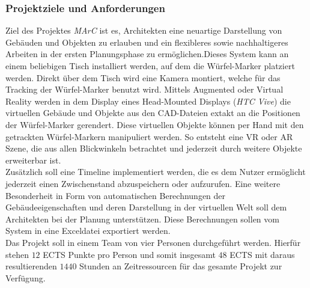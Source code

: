 \subsubsection{Projektziele und Anforderungen}
Ziel des Projektes \textit{MArC} ist es, Architekten eine neuartige Darstellung von Gebäuden und Objekten zu erlauben und ein flexibleres sowie nachhaltigeres Arbeiten in der ersten Planungsphase zu ermöglichen.Dieses System kann an einem beliebigen Tisch installiert werden, auf dem die Würfel-Marker platziert werden. Direkt über dem Tisch wird eine Kamera montiert, welche für das Tracking der Würfel-Marker benutzt wird.  Mittels Augmented oder Virtual Reality werden in dem Display eines Head-Mounted Displays (\textit{HTC Vive}) die virtuellen Gebäude und Objekte aus den CAD-Dateien extakt an die Positionen der Würfel-Marker gerendert. Diese virtuellen Objekte können per Hand mit den getrackten Würfel-Markern manipuliert werden. So entsteht eine VR oder AR Szene, die aus allen Blickwinkeln betrachtet und jederzeit durch weitere Objekte erweiterbar ist. \\
Zusätzlich soll eine Timeline implementiert werden, die es dem Nutzer ermöglicht jederzeit einen Zwischenstand abzuspeichern oder aufzurufen. Eine weitere Besonderheit in Form von automatischen Berechnungen der Gebäudeeigenschaften und deren Darstellung in der virtuellen Welt soll dem Architekten bei der Planung unterstützen. Diese Berechnungen sollen vom System in eine Exceldatei exportiert werden.\\
Das Projekt soll in einem Team von vier Personen durchgeführt werden. Hierfür stehen $12$ ECTS Punkte pro Person und somit insgesamt $48$ ECTS mit daraus resultierenden $1440$ Stunden an Zeitressourcen für das gesamte Projekt zur Verfügung.


